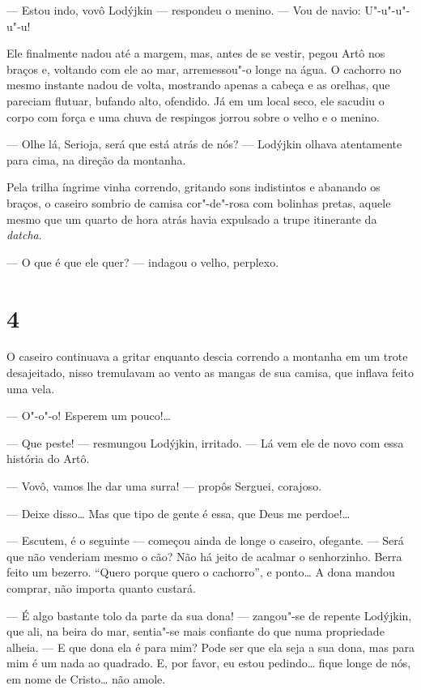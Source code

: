 --- Estou indo, vovô Lodýjkin --- respondeu o menino. --- Vou de navio:
U"-u"-u"-u"-u!

Ele finalmente nadou até a margem, mas, antes de se vestir, pegou Artô
nos braços e, voltando com ele ao mar, arremessou"-o longe na água. O
cachorro no mesmo instante nadou de volta, mostrando apenas a cabeça e
as orelhas, que pareciam flutuar, bufando alto, ofendido. Já em um local
seco, ele sacudiu o corpo com força e uma chuva de respingos jorrou
sobre o velho e o menino.

--- Olhe lá, Serioja, será que está atrás de nós? --- Lodýjkin olhava
atentamente para cima, na direção da montanha.

Pela trilha íngrime vinha correndo, gritando sons indistintos e abanando
os braços, o caseiro sombrio de camisa cor"-de"-rosa com bolinhas pretas,
aquele mesmo que um quarto de hora atrás havia expulsado a trupe
itinerante da \emph{datcha}.

--- O que é que ele quer? --- indagou o velho, perplexo.

\section{4}

O caseiro continuava a gritar enquanto descia correndo a montanha em um
trote desajeitado, nisso tremulavam ao vento as mangas de sua camisa,
que inflava feito uma vela.

--- O"-o"-o! Esperem um pouco!\ldots{}

--- Que peste! --- resmungou Lodýjkin, irritado. --- Lá vem ele de novo
com essa história do Artô.

--- Vovô, vamos lhe dar uma surra! --- propôs Serguei, corajoso.

--- Deixe disso\ldots{} Mas que tipo de gente é essa, que Deus me perdoe!\ldots{}

--- Escutem, é o seguinte --- começou ainda de longe o caseiro,
ofegante. --- Será que não venderiam mesmo o cão? Não há jeito de
acalmar o senhorzinho. Berra feito um bezerro. ``Quero porque quero o
cachorro'', e ponto\ldots{} A dona mandou comprar, não importa quanto
custará.

--- É algo bastante tolo da parte da sua dona! --- zangou"-se de repente
Lodýjkin, que ali, na beira do mar, sentia"-se mais confiante do que numa
propriedade alheia. --- E que dona ela é para mim? Pode ser que ela seja
a sua dona, mas para mim é um nada ao quadrado. E, por favor, eu estou
pedindo\ldots{} fique longe de nós, em nome de Cristo\ldots{} não amole.

